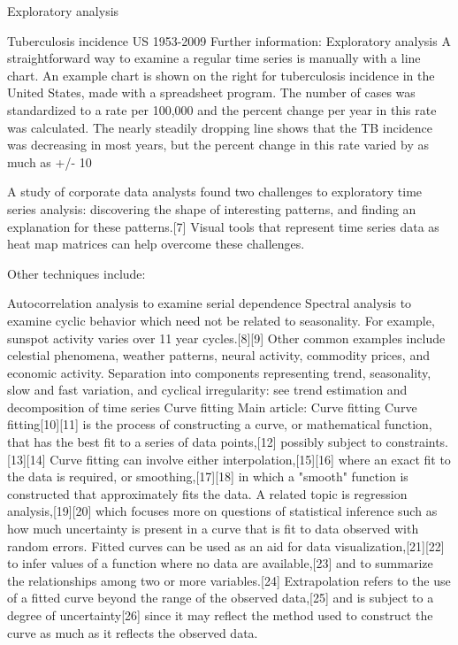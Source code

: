 Exploratory analysis

Tuberculosis incidence US 1953-2009
Further information: Exploratory analysis
A straightforward way to examine a regular time series is manually with a line chart. An example chart is shown on the right for tuberculosis incidence in the United States, made with a spreadsheet program. The number of cases was standardized to a rate per 100,000 and the percent change per year in this rate was calculated. The nearly steadily dropping line shows that the TB incidence was decreasing in most years, but the percent change in this rate varied by as much as +/- 10%

A study of corporate data analysts found two challenges to exploratory time series analysis: discovering the shape of interesting patterns, and finding an explanation for these patterns.[7] Visual tools that represent time series data as heat map matrices can help overcome these challenges.

Other techniques include:

Autocorrelation analysis to examine serial dependence
Spectral analysis to examine cyclic behavior which need not be related to seasonality. For example, sunspot activity varies over 11 year cycles.[8][9] Other common examples include celestial phenomena, weather patterns, neural activity, commodity prices, and economic activity.
Separation into components representing trend, seasonality, slow and fast variation, and cyclical irregularity: see trend estimation and decomposition of time series
Curve fitting
Main article: Curve fitting
Curve fitting[10][11] is the process of constructing a curve, or mathematical function, that has the best fit to a series of data points,[12] possibly subject to constraints.[13][14] Curve fitting can involve either interpolation,[15][16] where an exact fit to the data is required, or smoothing,[17][18] in which a "smooth" function is constructed that approximately fits the data. A related topic is regression analysis,[19][20] which focuses more on questions of statistical inference such as how much uncertainty is present in a curve that is fit to data observed with random errors. Fitted curves can be used as an aid for data visualization,[21][22] to infer values of a function where no data are available,[23] and to summarize the relationships among two or more variables.[24] Extrapolation refers to the use of a fitted curve beyond the range of the observed data,[25] and is subject to a degree of uncertainty[26] since it may reflect the method used to construct the curve as much as it reflects the observed data.

